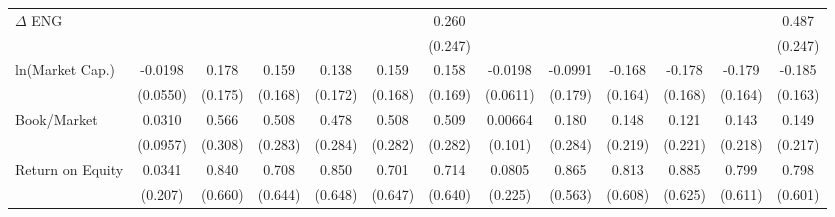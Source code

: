 {\begin{tabular}{l*{12}{c}}
$\Delta$ ENG        &                     &                     &                     &                     &                     &       0.260         &                     &                     &                     &                     &                     &       0.487\sym{*}  \\
                    &                     &                     &                     &                     &                     &     (0.247)         &                     &                     &                     &                     &                     &     (0.247)         \\
ln(Market Cap.)     &     -0.0198         &       0.178         &       0.159         &       0.138         &       0.159         &       0.158         &     -0.0198         &     -0.0991         &      -0.168         &      -0.178         &      -0.179         &      -0.185         \\
                    &    (0.0550)         &     (0.175)         &     (0.168)         &     (0.172)         &     (0.168)         &     (0.169)         &    (0.0611)         &     (0.179)         &     (0.164)         &     (0.168)         &     (0.164)         &     (0.163)         \\
Book/Market         &      0.0310         &       0.566\sym{*}  &       0.508\sym{*}  &       0.478\sym{*}  &       0.508\sym{*}  &       0.509\sym{*}  &     0.00664         &       0.180         &       0.148         &       0.121         &       0.143         &       0.149         \\
                    &    (0.0957)         &     (0.308)         &     (0.283)         &     (0.284)         &     (0.282)         &     (0.282)         &     (0.101)         &     (0.284)         &     (0.219)         &     (0.221)         &     (0.218)         &     (0.217)         \\
Return on Equity    &      0.0341         &       0.840         &       0.708         &       0.850         &       0.701         &       0.714         &      0.0805         &       0.865         &       0.813         &       0.885         &       0.799         &       0.798         \\
                    &     (0.207)         &     (0.660)         &     (0.644)         &     (0.648)         &     (0.647)         &     (0.640)         &     (0.225)         &     (0.563)         &     (0.608)         &     (0.625)         &     (0.611)         &     (0.601)         \\

\end{tabular}}
